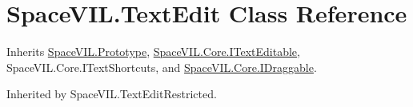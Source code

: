 \hypertarget{class_space_v_i_l_1_1_text_edit}{}\section{Space\+V\+I\+L.\+Text\+Edit Class Reference}
\label{class_space_v_i_l_1_1_text_edit}


Inherits \mbox{\hyperlink{class_space_v_i_l_1_1_prototype}{Space\+V\+I\+L.\+Prototype}}, \mbox{\hyperlink{interface_space_v_i_l_1_1_core_1_1_i_text_editable}{Space\+V\+I\+L.\+Core.\+I\+Text\+Editable}}, Space\+V\+I\+L.\+Core.\+I\+Text\+Shortcuts, and \mbox{\hyperlink{interface_space_v_i_l_1_1_core_1_1_i_draggable}{Space\+V\+I\+L.\+Core.\+I\+Draggable}}.



Inherited by Space\+V\+I\+L.\+Text\+Edit\+Restricted.

